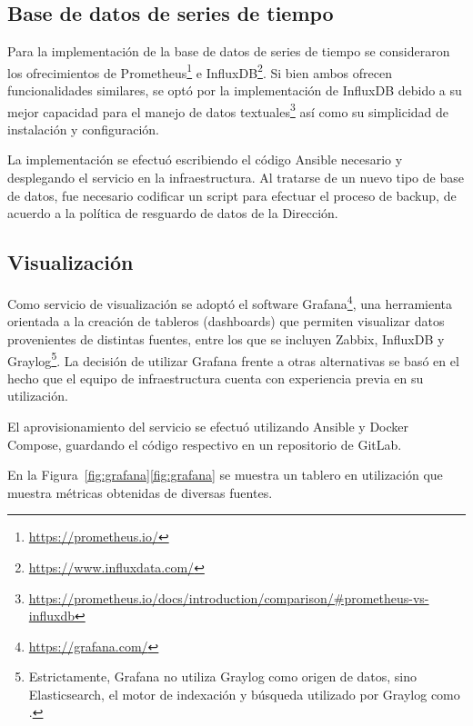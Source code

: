 %
\subsection{Base de datos de series de tiempo}
%
Para la implementación de la base de datos de series de tiempo se
consideraron los ofrecimientos de Prometheus\footnote{
  \url{https://prometheus.io/} } e InfluxDB\footnote{
  \url{https://www.influxdata.com/} }. Si bien ambos ofrecen
funcionalidades similares, se optó por la implementación de InfluxDB
debido a su mejor capacidad para el manejo de datos
textuales\footnote{
  \url{https://prometheus.io/docs/introduction/comparison/\#prometheus-vs-influxdb}
} así como su simplicidad de instalación y configuración.

La implementación se efectuó escribiendo el código Ansible necesario y
desplegando el servicio en la infraestructura. Al tratarse de un nuevo
tipo de base de datos, fue necesario codificar un script para efectuar
el proceso de backup, de acuerdo a la política de resguardo de datos
de la Dirección.
%
\subsection{Visualización}
%
Como servicio de visualización se adoptó el software Grafana\footnote{
  \url{https://grafana.com/} }, una herramienta orientada a la
creación de tableros (dashboards) que permiten visualizar datos
provenientes de distintas fuentes, entre los que se incluyen Zabbix,
InfluxDB y Graylog\footnote{ Estrictamente, Grafana no utiliza Graylog
  como origen de datos, sino Elasticsearch, el motor de indexación y
  búsqueda utilizado por Graylog como .}. La decisión de
utilizar Grafana frente a otras alternativas se basó en el hecho que
el equipo de infraestructura cuenta con experiencia previa en su
utilización.

El aprovisionamiento del servicio se efectuó utilizando Ansible y
Docker Compose, guardando el código respectivo en un repositorio de
GitLab.

En la
\iflatexml{}Figura~\ref{fig:grafana}\else\autoref{fig:grafana}\fi{} se
muestra un tablero en utilización que muestra métricas obtenidas de
diversas fuentes.
